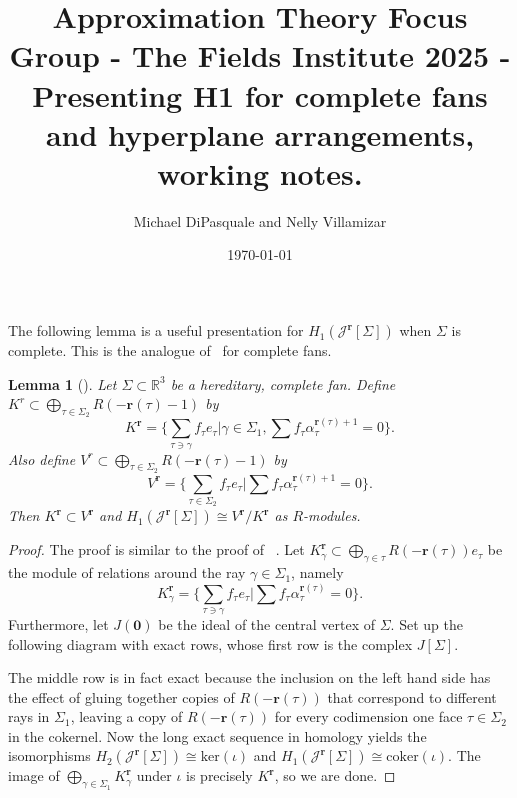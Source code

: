 \documentclass[11pt, reqno]{amsart}
\title{Approximation Theory Focus Group - The Fields Institute 2025 - Presenting H1 for complete fans and hyperplane arrangements, working notes.}
\author{Michael DiPasquale and Nelly Villamizar}
\date{\today}
\newcommand{\R}{\mathbb{R}}
\newcommand{\br}{\mathbf{r}}
\newcommand{\calJ}{\mathcal{J}}
\newtheorem{lemma}[theorem]{Lemma}
\theoremstyle{definition}
\theoremstyle{remark}
\numberwithin{equation}{section}
\begin{document}
	
\maketitle

The following lemma is a useful presentation for $H_1(\calJ^{\br}[\Sigma])$ when $\Sigma$ is complete. This is the analogue of~\cite[Lemma~3.8]{LCoho} for complete fans.

\begin{lemma}[{\cite[Lemma~9.12]{AssHom}}]\label{lem:H1Jpres}
	Let $\Sigma\subset\R^3$ be a hereditary, complete fan.  Define $K^r\subset \bigoplus\limits_{\tau\in\Sigma_2} R(-\br(\tau)-1)$ by
	\[
	K^{\br}=\{\sum_{\tau\ni\gamma} f_\tau e_\tau|\gamma\in\Sigma_1, \sum f_\tau \alpha_\tau^{\br(\tau)+1}=0\}.
	\]
	Also define $V^r\subset \bigoplus\limits_{\tau\in\Sigma_2} R(-\br(\tau)-1)$ by
	\[
	V^{\br}=\{\sum_{\tau\in\Sigma_2} f_\tau e_\tau| \sum f_\tau \alpha_\tau^{\br(\tau)+1}=0\}.
	\]
	Then $K^{\br}\subset V^{\br}$ and $H_1(\calJ^\br[\Sigma])\cong V^{\br}/K^{\br}$ as $R$-modules.
\end{lemma}
\begin{proof}
	The proof is similar to the proof of ~\cite[Lemma~3.8]{LCoho}.  Let $K_\gamma^{\br}\subset \bigoplus_{\gamma\in\tau} R(-\br(\tau))e_\tau$ be the module of relations around the ray $\gamma\in\Sigma_1$, namely
	\[
	K^{\br}_\gamma=\{\sum_{\tau\ni\gamma} f_\tau e_\tau|\sum f_\tau\alpha_\tau^{\br(\tau)}=0\}.
	\]
	Furthermore, let $J(\mathbf{0})$ be the ideal of the central vertex of $\Sigma$.  Set up the following diagram with exact rows, whose first row is the complex $J[\Sigma]$.
	
	\begin{center}
	\end{center}
	
	
	The middle row is in fact exact because the inclusion on the left hand side has the effect of gluing together copies of $R(-\br(\tau))$ that correspond to different rays in $\Sigma_1$, leaving a copy of $R(-\br(\tau))$ for every codimension one face $\tau\in\Sigma_2$ in the cokernel.  Now the long exact sequence in homology yields the isomorphisms $H_2(\calJ^\br[\Sigma])\cong \mbox{ker}(\iota)$ and $H_1(\calJ^\br[\Sigma])\cong \mbox{coker}(\iota)$.  The image of $\bigoplus\limits_{\gamma\in\Sigma_1} K^{\br}_\gamma$ under $\iota$ is precisely $K^{\br}$, so we are done.
\end{proof}
\end{document}
